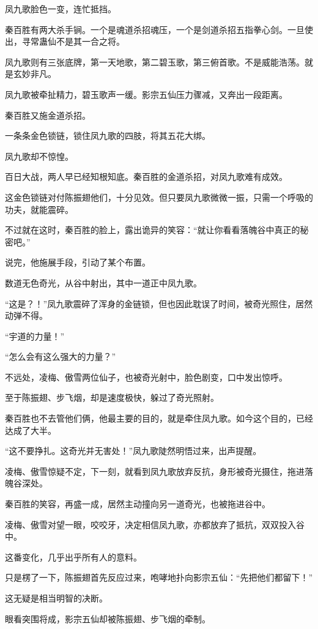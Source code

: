 \begin{this_body}
凤九歌脸色一变，连忙抵挡。

秦百胜有两大杀手锏。一个是魂道杀招魂压，一个是剑道杀招五指拳心剑。一旦使出，寻常蛊仙不是其一合之将。

凤九歌则有三张底牌，第一天地歌，第二碧玉歌，第三俯首歌。不是威能浩荡。就是玄妙非凡。

凤九歌被牵扯精力，碧玉歌声一缓。影宗五仙压力骤减，又奔出一段距离。

秦百胜又施金道杀招。

一条条金色锁链，锁住凤九歌的四肢，将其五花大绑。

凤九歌却不惊惶。

百日大战，两人早已经知根知底。秦百胜的金道杀招，对凤九歌难有成效。

这金色锁链对付陈振翅他们，十分见效。但只要凤九歌微微一振，只需一个呼吸的功夫，就能震碎。

不过就在这时，秦百胜的脸上，露出诡异的笑容：“就让你看看落魄谷中真正的秘密吧。”

说完，他施展手段，引动了某个布置。

数道无色奇光，从谷中射出，其中一道正中凤九歌。

“这是？！”凤九歌震碎了浑身的金链锁，但也因此耽误了时间，被奇光照住，居然动弹不得。

“宇道的力量！”

“怎么会有这么强大的力量？”

不远处，凌梅、傲雪两位仙子，也被奇光射中，脸色剧变，口中发出惊呼。

至于陈振翅、步飞烟，却是速度极快，躲过了奇光照射。

秦百胜也不去管他们俩，他最主要的目的，就是牵住凤九歌。如今这个目的，已经达成了大半。

“这不要挣扎。这奇光并无害处！”凤九歌陡然明悟过来，出声提醒。

凌梅、傲雪惊疑不定，下一刻，就看到凤九歌放弃反抗，身形被奇光摄住，拖进落魄谷深处。

秦百胜的笑容，再盛一成，居然主动撞向另一道奇光，也被拖进谷中。

凌梅、傲雪对望一眼，咬咬牙，决定相信凤九歌，亦都放弃了抵抗，双双投入谷中。

这番变化，几乎出乎所有人的意料。

只是楞了一下，陈振翅首先反应过来，咆哮地扑向影宗五仙：“先把他们都留下！”

这无疑是相当明智的决断。

眼看突围将成，影宗五仙却被陈振翅、步飞烟的牵制。


\end{this_body}
